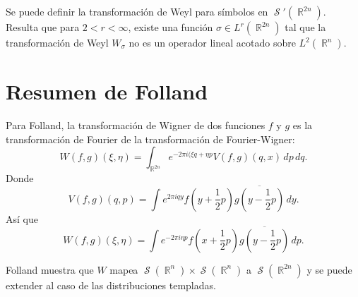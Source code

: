 \documentclass[a4paper]{report}
\DeclareMathOperator{\R}{\mathbb{R}}
\DeclareMathOperator{\Sz}{\mathcal S}
\begin{document}
  Se puede definir la transformación de Weyl para símbolos
  en $\Sz'(\R^{2n})$. Resulta que para $2 < r < \infty$,
  existe una función $\sigma \in L^{r}(\R^{2n})$ tal que la
  transformación de Weyl $W_\sigma$ no es un operador lineal
  acotado sobre $L^2(\R^{n})$.

  \section{Resumen de Folland}

  Para Folland, la transformación de Wigner de dos funciones
  $f$ y $g$ es la transformación de Fourier de la
  transformación de Fourier-Wigner:
  \[
    W(f,g)(\xi, \eta)
    = \int_{\R^{2n}} e^{-2\pi i (\xi q + \eta p} V(f,g)(q,x)
    \, dp \, dq.
  \] 
  Donde
  \[
    V(f,g)(q,p)
    = \int e^{2\pi i q y} f(y + \frac{1}{2}p)\overline{g(y -
    \frac{1}{2}p)} \, dy.
  \] 
  Así que
  \[
    W(f,g)(\xi, \eta) = \int e^{-2\pi i \eta p }
    f(x+\frac{1}{2}p)\overline{g(y-\frac{1}{2}p)} \, dp.
  \] 

  Folland muestra que $W$ mapea $\Sz(\R^{n}) \times
  \Sz(\R^{n})$ a $\Sz(\R^{2n})$ y se puede extender al caso
  de las distribuciones templadas.

  \newpage
  \printbibliography
\end{document}
